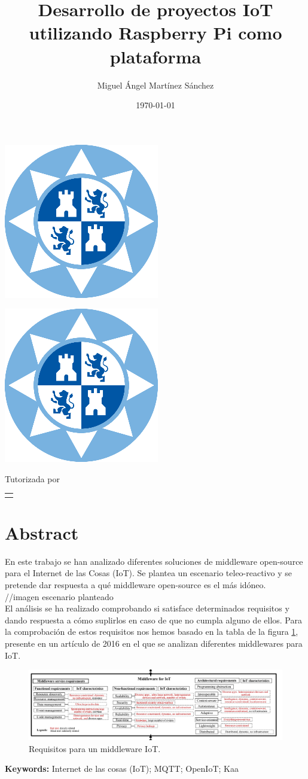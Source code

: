 \documentclass[12pt, twoside]{book}
\title{Desarrollo de proyectos IoT utilizando Raspberry Pi como plataforma}
\author{Miguel Ángel Martínez Sánchez}
\date{\today}
\makeatletter
\renewcommand\maketitle{%
  \begin{titlepage}
      \vspace*{1.5cm}
      \parskip=0pt
      \Huge\bfseries
      \begin{center}
          \leavevmode\includegraphics[totalheight=6cm]{sello.png}\\[2cm]
          \@title
      \end{center}
      \vspace{1cm}
      \begin{center}
          \@author
      \end{center}
  \end{titlepage}
  
  \begin{titlepage}
  \parindent=0pt
  \begin{flushleft}
  \vspace*{1.5mm}
  \setlength\baselineskip{0pt}
  \setlength\parskip{0mm}
  \begin{center}
      \leavevmode\includegraphics[totalheight=4.5cm]{sello.png}
  \end{center}
  \end{flushleft}
  \vspace{1cm}
  \bgroup
  \Large \bfseries
  \begin{center}
  \@title
  \end{center}
  \egroup
  \vspace*{.5cm}
  \begin{center}
  \@author
  \end{center}
  \vspace*{1.8cm}
  \begin{flushright}
  \begin{minipage}{8.45cm}

      \vspace*{7.5mm}

      Tutorizada por
  \end{minipage}\par
  \begin{tabularx}{8.45cm}[b]{@{}l}
      \guardatutores
  \end{tabularx}
   \end{flushright}
      \vspace*{\fill}
   \end{titlepage}
   \pagestyle{tfg}
   \renewcommand{\chaptermark}[1]{\markright{\thechapter.\space ##1}}
   \renewcommand{\sectionmark}[1]{}
   \renewcommand{\subsectionmark}[1]{}
  }
\makeatother
\begin{document}
 

\maketitle

\frontmatter
\tableofcontents

\mainmatter


\chapter*{Abstract}
En este trabajo se han analizado diferentes soluciones de middleware open-source para el Internet de las Cosas (IoT). Se plantea un escenario teleo-reactivo y se pretende dar respuesta a qué middleware open-source es el más idóneo.\\

//imagen escenario planteado\\

 El análisis se ha realizado comprobando si satisface determinados requisitos y dando respuesta a cómo suplirlos en caso de que no cumpla alguno de ellos. Para la comprobación de estos requisitos nos hemos basado en la tabla de la figura \ref{main_table}, presente en un artículo de 2016\cite{surv} en el que se analizan diferentes middlewares para IoT.\\
\begin{figure}[H]
\centering
\includegraphics[scale=0.5]{images/requisitos}
\caption{Requisitos para un middleware IoT.}\label{main_table}
\end{figure}

\textbf{Keywords:} Internet de las cosas (IoT); MQTT; OpenIoT; Kaa




\end{document}
